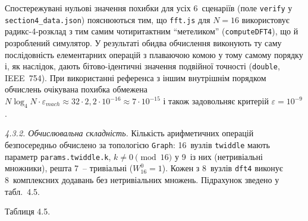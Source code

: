 \documentclass[
]{article}
\begin{document}
Спостережувані нульові значення похибки для усіх 6~сценаріїв (поле
\texttt{verify} у \texttt{section4\_data.json}) пояснюються тим, що
\texttt{fft.js} для \(N = 16\) використовує радикс-4-розклад з тим самим
чотиритактним ``метеликом'' (\texttt{computeDFT4}), що й розроблений
симулятор. У результаті обидва обчислення виконують ту саму послідовність
елементарних операцій з плаваючою комою у тому самому порядку і, як
наслідок, дають бітово-ідентичні значення подвійної точності
(\texttt{double}, IEEE~754). При використанні референса з іншим
внутрішнім порядком обчислень очікувана похибка обмежена
\(N \log_{4} N \cdot \varepsilon_{mach} \approx 32 \cdot 2{,}2 \cdot 10^{- 16}
\approx 7 \cdot 10^{- 15}\) і також задовольняє критерій
\(\varepsilon = 10^{- 9}\).

\emph{4.3.2. Обчислювальна складність.} Кількість арифметичних
операцій безпосередньо обчислено за топологією \texttt{Graph}: 16~вузлів
\texttt{twiddle} мають параметр \texttt{params.twiddle.k},
\(k \neq 0 \pmod{16}\) у 9~із них (нетривіальні множники), решта 7~--
тривіальні (\(W_{16}^{0} = 1\)). Кожен з 8~вузлів \texttt{dft4} виконує
8~комплексних додавань без нетривіальних множень. Підрахунок зведено у
табл.~4.5.

Таблиця 4.5.
\end{document}
